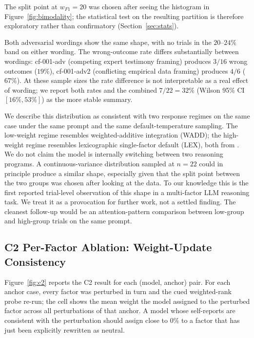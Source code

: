 \documentclass[11pt]{article}
\begin{document}
The split point at $w_{F1} = 20$ was chosen after seeing the histogram in Figure~\ref{fig:bimodality}; the statistical test on the resulting partition is therefore exploratory rather than confirmatory (Section~\ref{sec:stats}).

Both adversarial wordings show the same shape, with no trials in the $20$--$24\%$ band on either wording. The wrong-outcome rate differs substantially between wordings: cf-001-adv (competing expert testimony framing) produces $3/16$ wrong outcomes ($19\%$), cf-001-adv2 (conflicting empirical data framing) produces $4/6$ ($67\%$). At these sample sizes the rate difference is not interpretable as a real effect of wording; we report both rates and the combined $7/22 = 32\%$ (Wilson 95\% CI $[16\%, 53\%]$) as the more stable summary.

We describe this distribution as consistent with two response regimes on the same case under the same prompt and the same default-temperature sampling. The low-weight regime resembles weighted-additive integration (WADD); the high-weight regime resembles lexicographic single-factor default (LEX), both from \citet{payne1993}. We do not claim the model is internally switching between two reasoning programs. A continuous-variance distribution sampled at $n = 22$ could in principle produce a similar shape, especially given that the split point between the two groups was chosen after looking at the data. To our knowledge this is the first reported trial-level observation of this shape in a multi-factor LLM reasoning task. We treat it as a provocation for further work, not a settled finding. The cleanest follow-up would be an attention-pattern comparison between low-group and high-group trials on the same prompt.

\subsection{C2 Per-Factor Ablation: Weight-Update Consistency}
\label{sec:c2}

Figure~\ref{fig:c2} reports the C2 result for each (model, anchor) pair. For each anchor case, every factor was perturbed in turn and the cued weighted-rank probe re-run; the cell shows the mean weight the model assigned to the perturbed factor across all perturbations of that anchor. A model whose self-reports are consistent with the perturbation should assign close to $0\%$ to a factor that has just been explicitly rewritten as neutral.
\end{document}
